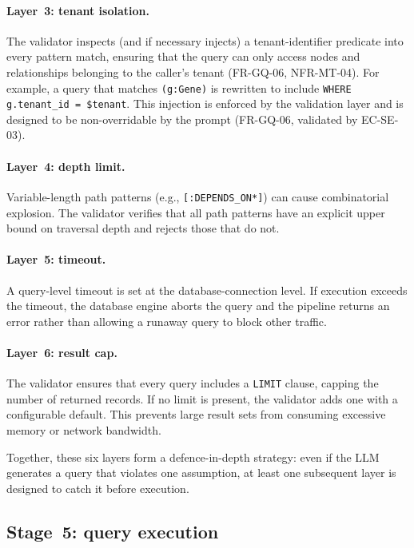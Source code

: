 \documentclass[a4paper,noexaminfo]{sapthesis}
\begin{document}
\paragraph{Layer~3: tenant isolation.}
The validator inspects (and if necessary injects) a tenant-identifier
predicate into every pattern match, ensuring that the query can only
access nodes and relationships belonging to the caller's tenant
(FR-GQ-06, NFR-MT-04).  For example, a query that matches
\texttt{(g:Gene)} is rewritten to include
\texttt{WHERE g.tenant\_id = \$tenant}.  This injection is enforced by
the validation layer and is designed to be non-overridable by the prompt
(FR-GQ-06, validated by EC-SE-03).

\paragraph{Layer~4: depth limit.}
Variable-length path patterns (e.g., \texttt{[:DEPENDS\_ON*]}) can cause
combinatorial explosion.  The validator verifies that all path patterns
have an explicit upper bound on traversal depth and rejects those that do
not.

\paragraph{Layer~5: timeout.}
A query-level timeout is set at the database-connection level.  If
execution exceeds the timeout, the database engine aborts the query and
the pipeline returns an error rather than allowing a runaway query to
block other traffic.

\paragraph{Layer~6: result cap.}
The validator ensures that every query includes a \texttt{LIMIT} clause,
capping the number of returned records.  If no limit is present, the
validator adds one with a configurable default.  This prevents large
result sets from consuming excessive memory or network bandwidth.

Together, these six layers form a defence-in-depth strategy: even if the
LLM generates a query that violates one assumption, at least one subsequent
layer is designed to catch it before execution.

\subsection{Stage~5: query execution}
\end{document}

